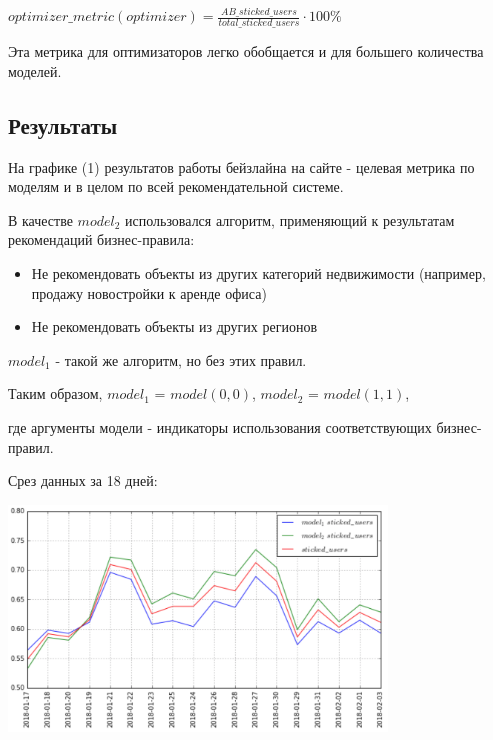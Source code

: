 \documentclass{article}
\begin{document}
\par
\vspace{3mm}

$optimizer\_metric(optimizer) =\frac{AB\_sticked\_users}{total\_sticked\_users}\cdot 100\%$

\par
\vspace{3mm}

Эта метрика для оптимизаторов легко обобщается и для большего количества моделей.


\subsection{Результаты}


На графике (1) результатов работы бейзлайна на сайте - целевая метрика по моделям и в целом по всей рекомендательной системе. 
\par

В качестве $model_2$ использовался алгоритм, применяющий к результатам рекомендаций бизнес-правила:
\par
\begin{itemize}  
\item Не рекомендовать объекты из других категорий недвижимости (например, продажу новостройки к аренде офиса)
\item Не рекомендовать объекты из других регионов
\end{itemize}

\par
$model_1$ - такой же алгоритм, но без этих правил.

\par

Таким образом, $model_1$ = $model(0, 0)$, $model_2$ = $model(1, 1)$,
\par 
где аргументы модели - индикаторы использования соответствующих бизнес-правил.

\par
Срез данных за 18 дней:
\par
\vspace{3mm}

\includegraphics[height=6cm]{img1.png}
\end{document}
